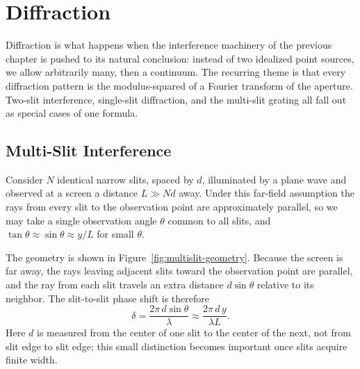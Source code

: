 \chapter{Diffraction}

Diffraction is what happens when the interference machinery of the previous chapter is pushed to its natural conclusion: instead of two idealized point sources, we allow arbitrarily many, then a continuum. The recurring theme is that every diffraction pattern is the modulus-squared of a Fourier transform of the aperture. Two-slit interference, single-slit diffraction, and the multi-slit grating all fall out as special cases of one formula.

\section{Multi-Slit Interference}

Consider $N$ identical narrow slits, spaced by $d$, illuminated by a plane wave and observed at a screen a distance $L \gg Nd$ away. Under this far-field assumption the rays from every slit to the observation point are approximately parallel, so we may take a single observation angle $\theta$ common to all slits, and $\tan\theta \approx \sin\theta \approx y/L$ for small $\theta$.

The geometry is shown in Figure~\ref{fig:multislit-geometry}. Because the screen is far away, the rays leaving adjacent slits toward the observation point are parallel, and the ray from each slit travels an extra distance $d\sin\theta$ relative to its neighbor. The slit-to-slit phase shift is therefore
\begin{equation}
    \delta = \frac{2\pi\, d\sin\theta}{\lambda} \approx \frac{2\pi\, d\, y}{\lambda L}.
\end{equation}
Here $d$ is measured from the center of one slit to the center of the next, not from slit edge to slit edge; this small distinction becomes important once slits acquire finite width.

